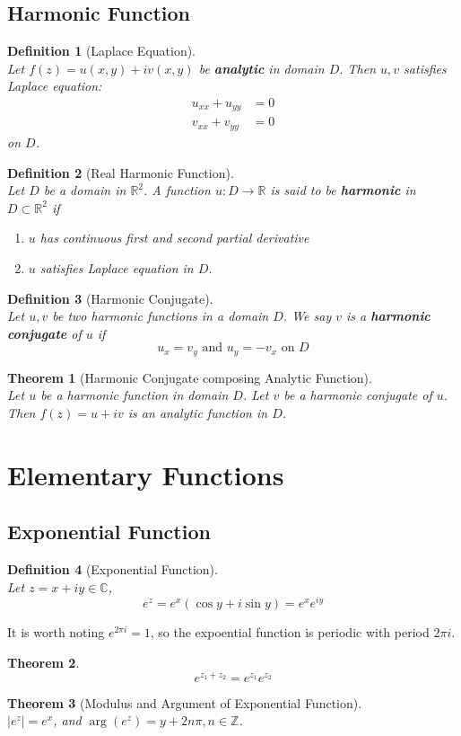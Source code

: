 \documentclass[12pt]{article}
\newtheorem{definition}{Definition}[section]
\newtheorem{theorem}{Theorem}[section]
\theoremstyle{definition}
\begin{document}
\subsection{Harmonic Function}
\begin{definition}[Laplace Equation]
\hfill\\\normalfont Let $f(z)=u(x,y)+iv(x,y)$ be \textbf{analytic} in domain $D$. Then $u, v$ satisfies Laplace equation:
\begin{align*}
u_{xx}+u_{yy}&=0\\
v_{xx}+v_{yy}&=0
\end{align*}
on $D$.
\end{definition}
\begin{definition}[Real Harmonic Function]
\hfill\\\normalfont Let $D$ be a domain in $\mathbb{R}^2$. A function $u:D\to\mathbb{R}$ is said to be \textbf{harmonic} in $D\subset \mathbb{R}^2$ if
\begin{enumerate}
	\item $u$ has continuous first and second partial derivative
	\item $u$ satisfies Laplace equation in $D$.
\end{enumerate}
\end{definition}
\begin{definition}[Harmonic Conjugate]
\hfill\\\normalfont Let $u,v$ be two harmonic functions in a domain $D$. We say $v$ is a \textbf{harmonic conjugate} of $u$ if
\[
u_x=v_y\text{  and  }u_y=-v_x\text{  on }D
\]
\end{definition}
\begin{theorem}[Harmonic Conjugate composing Analytic Function]
\hfill\\\normalfont Let $u$ be a harmonic function in domain $D$. Let $v$ be a harmonic conjugate of $u$. Then $f(z)=u+iv$ is an analytic function in $D$.
\end{theorem}
\clearpage
\section{Elementary Functions}
\subsection{Exponential Function}
\begin{definition}[Exponential Function]
\hfill\\\normalfont Let $z=x+iy\in \mathbb{C}$,
\[
e^z = e^x(\cos y + i\sin y) = e^x e^{iy}
\]
\end{definition}
It is worth noting $e^{2\pi i} = 1$, so the expoential function is periodic with period $2\pi i$.\\
\begin{theorem}\[e^{z_1+z_2}=e^{z_1}e^{z_2}\]\end{theorem}
\begin{theorem}[Modulus and Argument of Exponential Function]
\hfill\\\normalfont $|e^z|=e^x$, and $\arg(e^z)=y+2n\pi, n\in \mathbb{Z}$.
\end{theorem}
\end{document}

